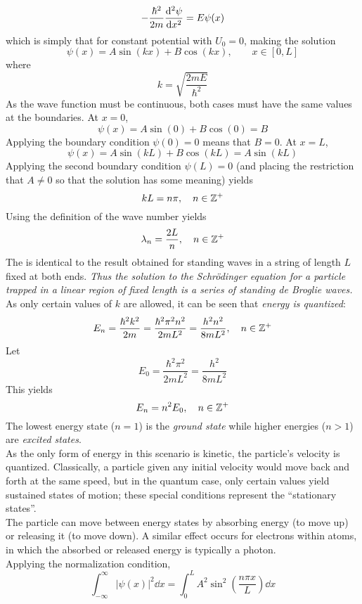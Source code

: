\documentclass{subfiles}
\begin{document}
				\[-\frac{\hbar^2}{2m}\dv[2]{\psi}{x} = E\psi(x)\]
				which is simply that for constant potential with \(U_0 = 0\), making the solution
				\[
					\psi(x) = A\sin(kx) + B\cos(kx), \qquad 
						x \in [0, L]
				\]
				where
				\[k = \sqrt{\frac{2mE}{\hbar^2}}\]
				As the wave function must be continuous, both cases must have the same values at the boundaries. At \(x = 0\),
				\[
					\psi(x) = A\sin(0) + B\cos(0)
						= B
				\]
				Applying the boundary condition \(\psi(0) = 0\) means that \(B = 0\). At \(x = L\),
				\[
					\psi(x) = A\sin(kL) + B\cos(kL)
						= A\sin(kL)
				\]
				Applying the second boundary condition \(\psi(L) = 0\) (and placing the restriction that \(A \ne 0\) so that the solution has some meaning) yields
				\[
					kL = n\pi
						, \quad n \in \mathbb{Z}^+
				\]
				Using the definition of the wave number yields
				\[
					\lambda_n = \frac{2L}{n}
						, \quad n \in \mathbb{Z}^+
				\]
				The is identical to the result obtained for standing waves in a string of length \(L\) fixed at both ends. \textit{Thus the solution to the Schr\"odinger equation for a particle trapped in a linear region of fixed length is a series of standing de Broglie waves.} \\
				As only certain values of \(k\) are allowed, it can be seen that \textit{energy is quantized}:
				\[
					E_n = \frac{\hbar^2k^2}{2m}
						= \frac{\hbar^2\pi^2n^2}{2mL^2}
						= \frac{h^2n^2}{8mL^2}
							, \quad n \in \mathbb{Z}^+
				\]
				Let
				\[
					E_0 = \frac{\hbar^2\pi^2}{2mL^2}
						= \frac{h^2}{8mL^2}
				\]
				This yields
				\[
					E_n = n^2E_0
						, \quad n \in \mathbb{Z}^+
				\]
				The lowest energy state (\(n = 1\)) is the \textit{ground state} while higher energies (\(n > 1\)) are \textit{excited states}. \\
				As the only form of energy in this scenario is kinetic, the particle's velocity is quantized. Classically, a particle given any initial velocity would move back and forth at the same speed, but in the quantum case, only certain values yield sustained states of motion; these special conditions represent the \enquote{stationary states}. \\
				The particle can move between energy states by absorbing energy (to move up) or releasing it (to move down). A similar effect occurs for electrons within atoms, in which the absorbed or released energy is typically a photon. \\
			Applying the normalization condition,
				\[
					\int_{-\infty}^\infty |\psi(x)|^2 \dd{x} = \int_0^L A^2\sin^2\left(\frac{n\pi x}{L}\right) \dd{x}
				\]
\end{document}
